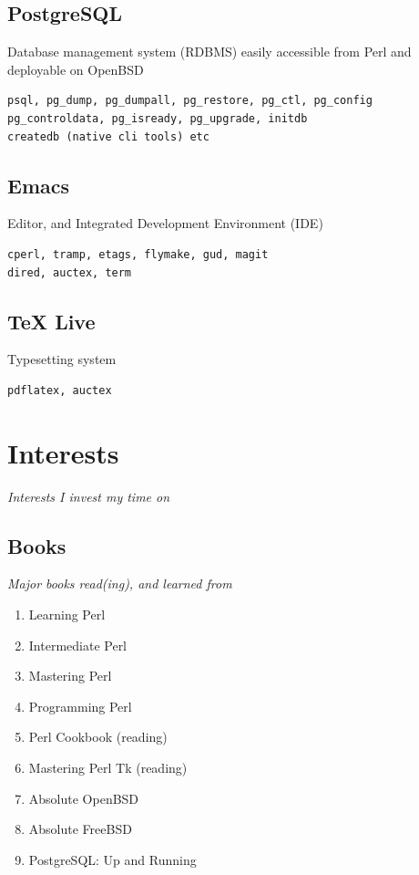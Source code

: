 \documentclass {article}
\begin{document}
    \subsection{PostgreSQL}
      Database management system (RDBMS) easily accessible from Perl and deployable on OpenBSD
      \begin{verbatim}
psql, pg_dump, pg_dumpall, pg_restore, pg_ctl, pg_config
pg_controldata, pg_isready, pg_upgrade, initdb
createdb (native cli tools) etc
  \end{verbatim}

    \subsection{Emacs}
    Editor, and Integrated Development Environment (IDE)
      \begin{verbatim}
cperl, tramp, etags, flymake, gud, magit
dired, auctex, term
   \end{verbatim}

    \subsection{TeX Live}
    Typesetting system
      \begin{verbatim}
pdflatex, auctex
   \end{verbatim}

  \section{Interests}
  \textit{Interests I invest my time on}

    \subsection{Books}
      \textit{Major books read(ing), and learned from}
      \begin{enumerate}
        \item{Learning Perl\cite{learning_perl}}
        \item{Intermediate Perl\cite{intermediate_perl}}
        \item{Mastering Perl\cite{mastering_perl}}
        \item{Programming Perl\cite{programming_perl}}
        \item{Perl Cookbook\cite{perl_cookbook}} (reading)
        \item{Mastering Perl Tk\cite{perl_tk}} (reading)
        \item{Absolute OpenBSD\cite{absolute_openbsd}}
        \item{Absolute FreeBSD\cite{absolute_freebsd}}
        \item{PostgreSQL: Up and Running\cite{postgresql}}
      \end{enumerate}
\end{document}

